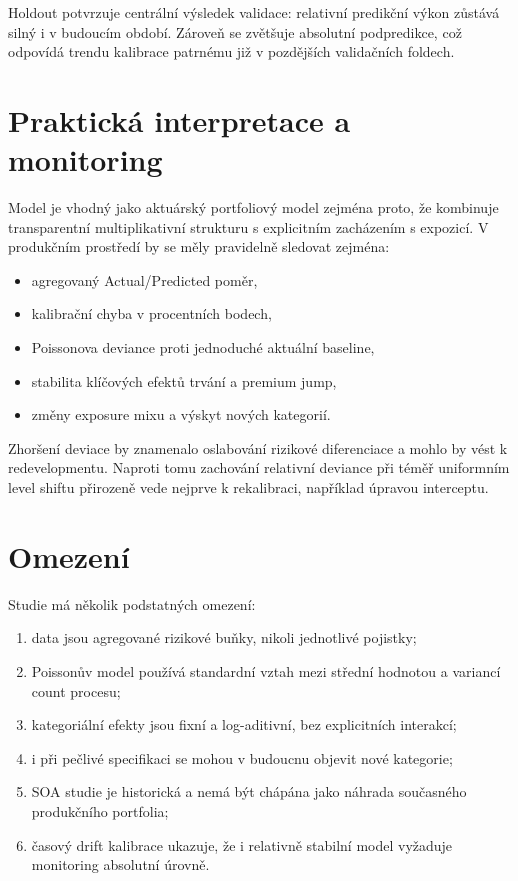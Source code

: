\documentclass[11pt,a4paper]{article}
\theoremstyle{definition}
\begin{document}
Holdout potvrzuje centrální výsledek validace: relativní predikční výkon zůstává silný i v budoucím období. Zároveň se zvětšuje absolutní podpredikce, což odpovídá trendu kalibrace patrnému již v pozdějších validačních foldech.

\section{Praktická interpretace a monitoring}
Model je vhodný jako aktuárský portfoliový model zejména proto, že kombinuje transparentní multiplikativní strukturu s explicitním zacházením s expozicí. V produkčním prostředí by se měly pravidelně sledovat zejména:
\begin{itemize}
\item agregovaný Actual/Predicted poměr,
\item kalibrační chyba v procentních bodech,
\item Poissonova deviance proti jednoduché aktuální baseline,
\item stabilita klíčových efektů trvání a premium jump,
\item změny exposure mixu a výskyt nových kategorií.
\end{itemize}

Zhoršení deviace by znamenalo oslabování rizikové diferenciace a mohlo by vést k redevelopmentu. Naproti tomu zachování relativní deviance při téměř uniformním level shiftu přirozeně vede nejprve k rekalibraci, například úpravou interceptu.

\section{Omezení}
Studie má několik podstatných omezení:
\begin{enumerate}
\item data jsou agregované rizikové buňky, nikoli jednotlivé pojistky;
\item Poissonův model používá standardní vztah mezi střední hodnotou a variancí count procesu;
\item kategoriální efekty jsou fixní a log-aditivní, bez explicitních interakcí;
\item i při pečlivé specifikaci se mohou v budoucnu objevit nové kategorie;
\item SOA studie je historická a nemá být chápána jako náhrada současného produkčního portfolia;
\item časový drift kalibrace ukazuje, že i relativně stabilní model vyžaduje monitoring absolutní úrovně.
\end{enumerate}
\end{document}
